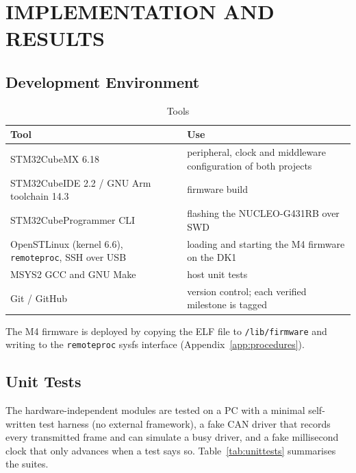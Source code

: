 \chapter{IMPLEMENTATION AND RESULTS}
\label{ch:results}

\section{Development Environment}

\begin{table}[H]
\centering
\small
\caption{Tools}
\label{tab:tools}
\begin{tabularx}{\textwidth}{@{}lX@{}}
\toprule
\textbf{Tool} & \textbf{Use} \\
\midrule
STM32CubeMX 6.18 & peripheral, clock and middleware configuration of both projects \\
STM32CubeIDE 2.2 / GNU Arm toolchain 14.3 & firmware build \\
STM32CubeProgrammer CLI & flashing the NUCLEO-G431RB over SWD \\
OpenSTLinux (kernel 6.6), \texttt{remoteproc}, SSH over USB & loading and starting the M4 firmware on the DK1 \\
MSYS2 GCC and GNU Make & host unit tests \\
Git / GitHub & version control; each verified milestone is tagged \\
\bottomrule
\end{tabularx}
\end{table}

The M4 firmware is deployed by copying the ELF file to \texttt{/lib/firmware} and writing to the \texttt{remoteproc} sysfs interface (Appendix~\ref{app:procedures}).

\section{Unit Tests}

The hardware-independent modules are tested on a PC with a minimal self-written test harness (no external framework), a fake CAN driver that records every transmitted frame and can simulate a busy driver, and a fake millisecond clock that only advances when a test says so. Table~\ref{tab:unittests} summarises the suites.

